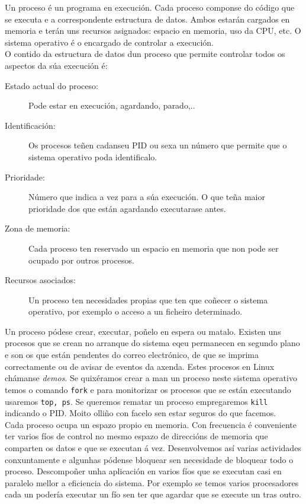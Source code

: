 Un proceso é un programa en execución. Cada proceso componse do código que se executa e a correspondente estructura de datos. Ambos estarán cargados en memoria e terán uns recursos asignados: espacio en memoria, uso da CPU, etc.  O sistema operativo é o encargado de controlar a execución.\\


O contido da estructura de datos dun proceso que  permite controlar todos os aspectos da súa execución é:
\begin{singlespace}
\begin{description}
	\item[Estado actual do proceso:] Pode estar en execución, agardando, parado,..

	\item[Identificación:] Os procesos teñen cadanseu PID ou sexa un número que permite que o sistema operativo poda identificalo. 
	\item[Prioridade:] Número que indica a vez para a súa execución. O que teña maior prioridade dos que están agardando executarase antes.
	\item[Zona de memoria:] Cada proceso ten reservado un espacio en memoria que non pode ser ocupado por outros procesos.
	\item[Recursos asociados:] Un proceso ten necesidades propias que ten que coñecer o sistema operativo, por exemplo o acceso a un ficheiro  determinado.
\end{description} 
\end{singlespace}

Un proceso pódese crear, executar, poñelo en espera ou matalo. Existen uns procesos que se crean no arranque do sistema eqeu permanecen en segundo plano e son os que están pendentes do correo electrónico, de que se imprima correctamente ou de avisar de eventos da axenda. Estes procesos en Linux chámanse \textit{demos}. Se quixéramos crear a man un proceso neste sistema operativo temos o comando \texttt{fork} e para monitorizar os procesos que se están executando usaremos \texttt{top, ps}. Se queremos rematar un proceso empregaremos \texttt{kill} indicando o PID. Moito olliño con facelo sen estar seguros do que facemos.\\
Cada proceso ocupa un espazo propio en memoria. Con frecuencia é conveniente ter varios fíos de control no mesmo espazo de direccións de memoria que comparten os datos e  que se executan á vez. Desenvolvemos así varias actividades conxuntamente e algunhas  pódense bloquear sen necesidade de bloquear todo o proceso. Descompoñer unha aplicación en varios fíos  que se executan casi en paralelo mellor a eficiencia do sistema. Por exemplo se temos varios procesadores cada un podería executar un fío sen ter que agardar que se execute un tras outro.\\
